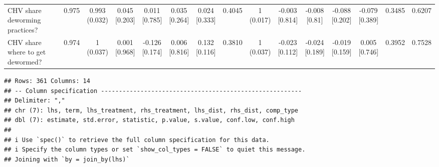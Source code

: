 \documentclass[
]{article}
\begin{document}
\begin{table}
{\begin{tabular}[t]{lcccccccccccccc}
\hspace{1em}CHV share deworming practices? & 0.975 & \makecell[c]{0.993\\(0.032)} & \makecell[c]{0.045\\{[0.203]}} & \makecell[c]{0.011\\{[0.785]}} & \makecell[c]{0.035\\{[0.264]}} & \makecell[c]{0.024\\{[0.333]}} & 0.4045 & \makecell[c]{1\\(0.017)} & \makecell[c]{-0.003\\{[0.814]}} & \makecell[c]{-0.008\\{[0.81]}} & \makecell[c]{-0.088\\{[0.202]}} & \makecell[c]{-0.079\\{[0.389]}} & 0.3485 & 0.6207\\
\hspace{1em}CHV share where to get dewormed? & 0.974 & \makecell[c]{1\\(0.037)} & \makecell[c]{0.001\\{[0.968]}} & \makecell[c]{-0.126\\{[0.174]}} & \makecell[c]{0.006\\{[0.816]}} & \makecell[c]{0.132\\{[0.116]}} & 0.3810 & \makecell[c]{1\\(0.037)} & \makecell[c]{-0.023\\{[0.112]}} & \makecell[c]{-0.024\\{[0.189]}} & \makecell[c]{-0.019\\{[0.159]}} & \makecell[c]{0.005\\{[0.746]}} & 0.3952 & 0.7528\\
\bottomrule
\end{tabular}}
\end{table}

\begin{verbatim}
## Rows: 361 Columns: 14
## -- Column specification --------------------------------------------------------
## Delimiter: ","
## chr (7): lhs, term, lhs_treatment, rhs_treatment, lhs_dist, rhs_dist, comp_type
## dbl (7): estimate, std.error, statistic, p.value, s.value, conf.low, conf.high
## 
## i Use `spec()` to retrieve the full column specification for this data.
## i Specify the column types or set `show_col_types = FALSE` to quiet this message.
## Joining with `by = join_by(lhs)`
\end{verbatim}
\end{document}
